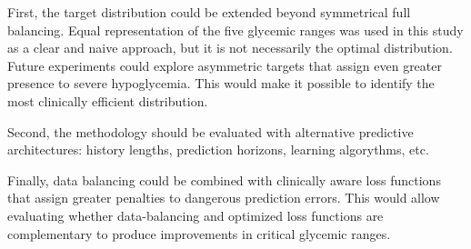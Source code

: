 First, the target distribution could be extended beyond symmetrical full balancing. Equal representation of the five glycemic ranges was used in this study as a clear and naive approach, but it is not necessarily the optimal distribution. Future experiments could explore asymmetric targets that assign even greater presence to severe hypoglycemia. This would make it possible to identify the most clinically efficient distribution.

Second, the methodology should be evaluated with alternative predictive architectures: history lengths, prediction horizons, learning algorythms, etc.

Finally, data balancing could be combined with clinically aware loss functions that assign greater penalties to dangerous prediction errors. This would allow evaluating whether data-balancing and optimized loss functions are complementary to produce improvements in critical glycemic ranges.